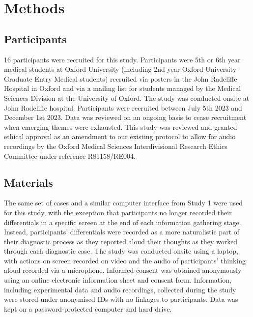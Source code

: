 \documentclass[a4paper, nobind]{templates/ociamthesis}
\begin{document}
\hypertarget{methods-1}{%
\section*{Methods}\label{methods-1}}

\hypertarget{participants-1}{%
\subsection*{Participants}\label{participants-1}}

16 participants were recruited for this study. Participants were 5th or 6th year medical students at Oxford University (including 2nd year Oxford University Graduate Entry Medical students) recruited via posters in the John Radcliffe Hospital in Oxford and via a mailing list for students managed by the Medical Sciences Division at the University of Oxford. The study was conducted onsite at John Radcliffe hospital. Participants were recruited between July 5th 2023 and December 1st 2023. Data was reviewed on an ongoing basis to cease recruitment when emerging themes were exhausted. This study was reviewed and granted ethical approval as an amendment to our existing protocol to allow for audio recordings by the Oxford Medical Sciences Interdivisional Research Ethics Committee under reference R81158/RE004.

\hypertarget{materials-1}{%
\subsection*{Materials}\label{materials-1}}

The same set of cases and a similar computer interface from Study 1 were used for this study, with the exception that participants no longer recorded their differentials in a specific screen at the end of each information gathering stage. Instead, participants' differentials were recorded as a more naturalistic part of their diagnostic process as they reported aloud their thoughts as they worked through each diagnostic case. The study was conducted onsite using a laptop, with actions on screen recorded on video and the audio of participants' thinking aloud recorded via a microphone. Informed consent was obtained anonymously using an online electronic information sheet and consent form. Information, including experimental data and audio recordings, collected during the study were stored under anonymised IDs with no linkages to participants. Data was kept on a password-protected computer and hard drive.
\end{document}
